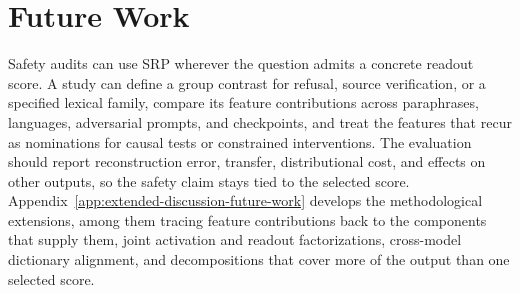 \section{Future Work}

Safety audits can use SRP wherever the question admits a concrete
readout score. A study can define a group contrast for refusal, source
verification, or a specified lexical family, compare its feature
contributions across paraphrases, languages, adversarial prompts, and
checkpoints, and treat the features that recur as nominations for
causal tests or constrained interventions. The evaluation should
report reconstruction error, transfer, distributional cost, and
effects on other outputs, so the safety claim stays tied to the
selected score.
Appendix~\ref{app:extended-discussion-future-work} develops the
methodological extensions, among them tracing feature contributions
back to the components that supply them, joint activation and readout
factorizations, cross-model dictionary alignment, and decompositions
that cover more of the output than one selected score.
